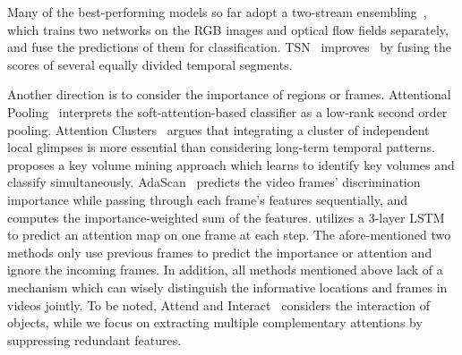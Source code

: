 \documentclass[runningheads]{llncs}
\begin{document}
Many of the best-performing models so far adopt a two-stream ensembling~\cite{simonyan2014two}, which trains two networks on the RGB images and optical flow fields separately, and fuse the predictions of them for classification. TSN~\cite{wang2016temporal} improves~\cite{simonyan2014two} by fusing the scores of several equally divided temporal segments.

Another direction is to consider the importance of regions or frames. Attentional Pooling~\cite{girdhar2017attentional} interprets the soft-attention-based classifier as a low-rank second order pooling. 
Attention Clusters~\cite{long2018attention} argues that integrating a cluster of independent local glimpses is more essential than considering long-term temporal patterns.
\cite{zhu2016key} proposes a key volume mining approach which learns to identify key volumes and classify simultaneously. 
AdaScan~\cite{Kar_2017_CVPR} predicts the video frames' discrimination importance while passing through each frame's features sequentially, and computes the importance-weighted sum of the features. \cite{sharma2015action} utilizes a 3-layer LSTM to predict an attention map on one frame at each step. The afore-mentioned two methods only use previous frames to predict the importance or attention and ignore the incoming frames. In addition, all methods mentioned above lack of a mechanism which can wisely distinguish the informative locations and frames in videos jointly. 
To be noted, Attend and Interact~\cite{ma2017attend} considers the interaction of objects, while we focus on extracting multiple complementary attentions by suppressing redundant features.
\end{document}
